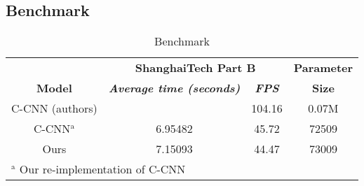 

\subsection{Benchmark}


\begin{table}[htbp]
\caption{\label{tab:benchmark-result}  Benchmark}
\begin{center}
\begin{tabular}{|c|c|c|c|}
\hline
\textbf{}&\multicolumn{2}{|c|}{\textbf{ShanghaiTech Part B}}&\textbf{Parameter} \\
\cline{1-3}
\textbf{Model} & \textbf{\textit{ Average time (seconds) }}& \textbf{\textit{FPS}}&\textbf{Size} \\
\hline
C-CNN (authors) &  &  104.16 & 0.07M \\
\hline
C-CNN$^{\mathrm{a}}$  & 6.95482 & 45.72 & 72509   \\
\hline
Ours &  7.15093 & 44.47 & 73009 \\
\hline
\multicolumn{4}{l}{$^{\mathrm{a}}$ Our re-implementation of C-CNN}
\end{tabular}

\end{center}
\end{table}